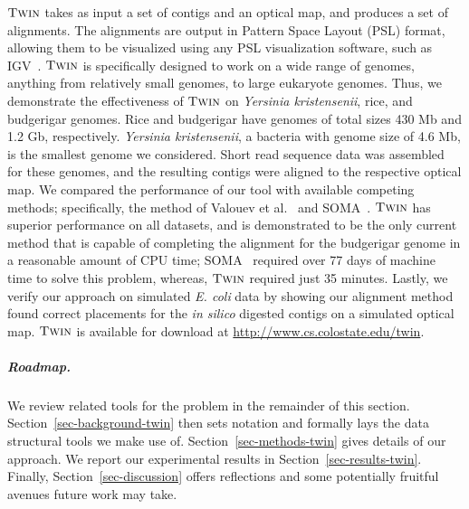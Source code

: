 $\mbox{\rm \textsc{Twin}}$ takes as input a set of contigs and an optical map, and produces a set of alignments.  The alignments are output in Pattern Space Layout (PSL) format, allowing them to be visualized using any PSL visualization software, such as IGV~\cite{igv}.  $\mbox{\rm \textsc{Twin}}$ is specifically designed to work on a wide range of genomes, anything from relatively small genomes, to large eukaryote genomes.  Thus, we demonstrate the effectiveness of $\mbox{\rm \textsc{Twin}}$ on \emph{Yersinia kristensenii}, rice, and budgerigar genomes.  Rice and budgerigar have genomes of total sizes 430 Mb and 1.2 Gb, respectively. \emph{Yersinia kristensenii}, a bacteria with genome size of 4.6 Mb, is the smallest genome we considered.   Short read sequence data was assembled for these genomes, and the resulting contigs were aligned to the respective optical map.   We compared the performance of our tool with available competing methods; specifically, the method of Valouev et al.~\cite{Valouev06} and SOMA~\cite{Nagarajan08}.  $\mbox{\rm \textsc{Twin}}$ has superior performance on all datasets, and is demonstrated to be the only current method that is capable of completing the alignment for the budgerigar genome in a reasonable amount of CPU time; SOMA~\cite{Nagarajan08} required over 77 days of machine time to solve this problem, whereas, $\mbox{\rm \textsc{Twin}}$ required just 35 minutes. Lastly, we verify our approach on simulated \emph{E. coli} data by showing our alignment method found correct placements for the \emph{in silico} digested contigs on a simulated optical map.     $\mbox{\rm \textsc{Twin}}$ is available for download at \url{http://www.cs.colostate.edu/twin}.

\subparagraph{Roadmap.}
We review related tools for the problem in the remainder of this section. Section~\ref{sec-background-twin}
then sets notation and formally lays the data structural tools we make use of.
Section~\ref{sec-methods-twin} gives details of our approach. We report our experimental results in
Section~\ref{sec-results-twin}. Finally, Section~\ref{sec-discussion} offers reflections and some potentially
fruitful avenues future work may take.

